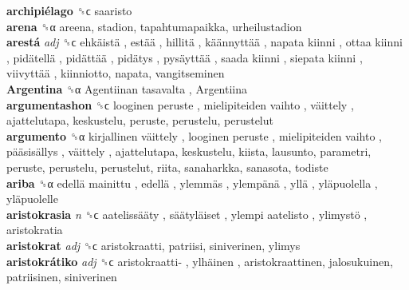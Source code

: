 \textbf{archipiélago} ␝ϲ  saaristo  \\
\textbf{arena} ␝α  areena, stadion, tapahtumapaikka, urheilustadion  \\
\textbf{arestá} \emph{adj}  ␝ϲ   ehkäistä ,  estää ,  hillitä ,  käännyttää ,  napata kiinni ,  ottaa kiinni ,  pidätellä ,  pidättää ,  pidätys ,  pysäyttää ,  saada kiinni ,  siepata kiinni ,  viivyttää , kiinniotto, napata, vangitseminen  \\
\textbf{Argentina} ␝α   Agentiinan tasavalta ,  Argentiina   \\
\textbf{argumentashon} ␝ϲ   looginen peruste ,  mielipiteiden vaihto ,  väittely , ajattelutapa, keskustelu, peruste, perustelu, perustelut  \\
\textbf{argumento} ␝α   kirjallinen väittely ,  looginen peruste ,  mielipiteiden vaihto ,  pääsisällys ,  väittely , ajattelutapa, keskustelu, kiista, lausunto, parametri, peruste, perustelu, perustelut, riita, sanaharkka, sanasota, todiste  \\
\textbf{ariba} ␝α   edellä mainittu ,  edellä ,  ylemmäs ,  ylempänä ,  yllä ,  yläpuolella ,  yläpuolelle   \\
\textbf{aristokrasia} \emph{n}  ␝ϲ   aatelissääty ,  säätyläiset ,  ylempi aatelisto ,  ylimystö , aristokratia  \\
\textbf{aristokrat} \emph{adj}  ␝ϲ  aristokraatti, patriisi, siniverinen, ylimys  \\
\textbf{aristokrátiko} \emph{adj}  ␝ϲ   aristokraatti- ,  ylhäinen , aristokraattinen, jalosukuinen, patriisinen, siniverinen  \\
